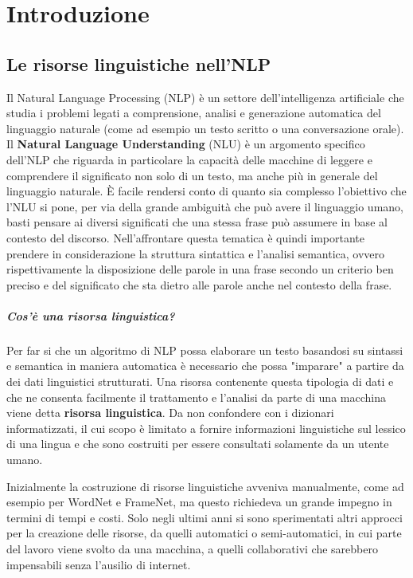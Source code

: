
\chapter{Introduzione}


\section{Le risorse linguistiche nell'NLP}
Il Natural Language Processing (NLP) è un settore dell'intelligenza artificiale
che studia i problemi legati a comprensione, analisi e generazione automatica del
linguaggio naturale (come ad esempio un testo scritto o una conversazione orale).
Il \textbf{Natural Language Understanding} (NLU) \cite{navigli2018natural} è un argomento
specifico dell'NLP che riguarda in particolare la capacità delle macchine di leggere
e comprendere il significato non solo di un testo, ma anche più in generale del linguaggio naturale.
È facile rendersi conto di quanto sia complesso l'obiettivo che l'NLU si pone,
per via della grande ambiguità che può avere il linguaggio umano, basti pensare
ai diversi significati che una stessa frase può assumere in base al contesto del
discorso.
Nell'affrontare questa tematica è quindi importante prendere in considerazione
la struttura sintattica e l'analisi semantica, ovvero rispettivamente la
disposizione delle parole in una frase secondo un criterio ben preciso e del
significato che sta dietro alle parole anche nel contesto della frase.

\paragraph{Cos'è una risorsa linguistica?}
Per far si che un algoritmo di NLP possa elaborare un testo basandosi su sintassi
e semantica in maniera automatica è necessario che possa "imparare" a partire
da dei dati linguistici strutturati.
Una risorsa contenente questa tipologia di dati e che ne consenta facilmente il
trattamento e l'analisi da parte di una macchina viene detta \textbf{risorsa linguistica}.
Da non confondere con i dizionari informatizzati, il cui scopo è limitato a
fornire informazioni linguistiche sul lessico di una lingua e che sono costruiti
per essere consultati solamente da un utente umano.

Inizialmente la costruzione di risorse linguistiche avveniva manualmente, come
ad esempio per WordNet e FrameNet, ma questo richiedeva un grande impegno in
termini di tempi e costi.
Solo negli ultimi anni si sono sperimentati altri approcci per la creazione
delle risorse, da quelli automatici o semi-automatici, in cui parte del lavoro
viene svolto da una macchina, a quelli collaborativi che sarebbero impensabili
senza l'ausilio di internet.

